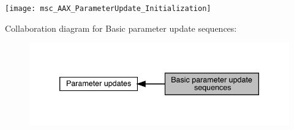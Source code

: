 \begin{DoxyImage}
\texttt{[image: msc\_AAX\_ParameterUpdate\_Initialization]}
\end{DoxyImage}
 Collaboration diagram for Basic parameter update sequences\+:
\nopagebreak
\begin{figure}[H]
\begin{center}
\leavevmode
\includegraphics[width=339pt]{a00823}
\end{center}
\end{figure}
